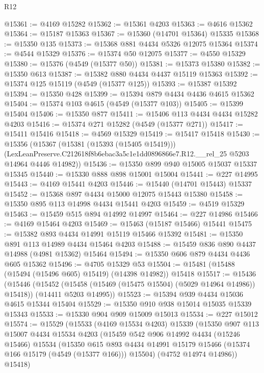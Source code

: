 \begin{lexlean}{R12}
\begin{coremodule}
@15361 := @4169 @15282
@15362 := @15361 @4203
@15363 := @4616 @15362
@15364 := @15187 @15363
@15367 := @15360 (@14701 @15364) @15335
@15368 := @15350 @135
@15373 := @15368 @881 @4434 @5326 @12075 @15364
@15374 := @4544 @15329
@15376 := @15374 @50 @12075
@15377 := @4550 @15329
@15380 := @15376 (@4549 (@15377 @50))
@15381 := @15373 @15380
@15382 := @15350 @613
@15387 := @15382 @880 @4434 @4437 @15119 @15363
@15392 := @15374 @125 @15119 (@4549 (@15377 @125))
@15393 := @15387 @15392
@15394 := @15350 @428
@15399 := @15394 @879 @4434 @4436 @4615 @15362
@15404 := @15374 @103 @4615 (@4549 (@15377 @103))
@15405 := @15399 @15404
@15406 := @15350 @877
@15411 := @15406 @113 @4434 @4434 @15282 @4203
@15416 := @15374 @271 @15282 (@4549 (@15377 @271))
@15417 := @15411 @15416
@15418 := @4569 @15329
@15419 := @15417 @15418
@15430 := @15356
    (@15367
      (@15381 (@15393 (@15405 @15419)))
      (LexLeanPreserve.C212618f8b6ebac3a5c1e1dd0896866e7.R12.__rel_25 @5203 @14964 @4446 @14982))
@15436 := @15350 @899 @940 @15005 @15037 @15337 @15345
@15440 := @15330 @888 @898 @15001 @15004
@15441 := @227 @14995
@15443 := @4169 @15441 @4203
@15446 := @15440 (@14701 @15443) @15337
@15452 := @15368 @897 @4434 @15000 @12075 @15443 @15380
@15458 := @15350 @895 @113 @14998 @4434 @15441 @4203
@15459 := @4519 @15329
@15463 := @15459 @515 @894 @14992 @14997
@15464 := @227 @14986
@15466 := @4169 @15464 @4203
@15469 := @15463 (@15187 @15466) @15441
@15475 := @15382 @893 @4434 @14991 @15119 @15466 @15392
@15481 := @15350 @891 @113 @14989 @4434 @15464 @4203
@15488 := @15459 @836 @890 @4437 @14988 (@4981 @15362) @15464
@15494 := @15350 @606 @879 @4434 @4436 @605 @15362
@15496 := @4705 @15329 @53
@15504 := @15481 (@15488 (@15494 (@15496 @605) @15419) (@14398 @14982)) @15418
@15517 := @15436
    (@15446
      (@15452 (@15458 (@15469 (@15475 @15504) (@5029 @14964 @14986)) @15418))
      (@14411 @5203 @14995))
@15523 := @15394 @939 @4434 @15036 @4615 @15344 @15404
@15529 := @15350 @910 @938 @15014 @15035 @15339 @15343
@15533 := @15330 @904 @909 @15009 @15013
@15534 := @227 @15012
@15574 := @15529
    (@15533
      (@4169 @15534 @4203)
      @15339
      (@15350
        @907
        @113
        @15007
        @4434
        @15534
        @4203
        (@15459
          @542
          @906
          @14992
          @4434
          (@15246 @15466)
          @15534
          (@15350
            @615
            @893
            @4434
            @14991
            @15179
            @15466
            (@15374 @166 @15179 (@4549 (@15377 @166)))
            @15504)
          (@4752 @14974 @14986))
        @15418)

\end{coremodule}
\end{lexlean}
